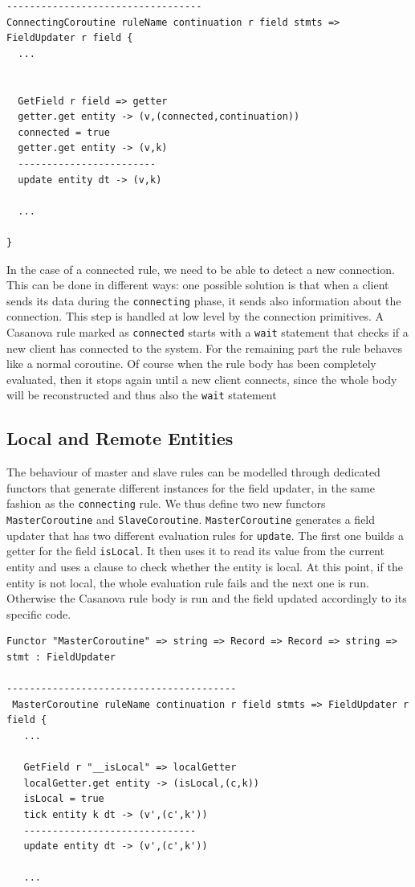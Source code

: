 \begin{lstlisting}
----------------------------------
ConnectingCoroutine ruleName continuation r field stmts => FieldUpdater r field {
  ...
  

  GetField r field => getter
  getter.get entity -> (v,(connected,continuation))
  connected = true
  getter.get entity -> (v,k)
  ------------------------
  update entity dt -> (v,k)
  
  ...

} 
\end{lstlisting}

\noindent
In the case of a connected rule, we need to be able to detect a new connection. This can be done in different ways: one possible solution is that when a client sends its data during the \texttt{connecting} phase, it sends also information about the connection. This step is handled at low level by the connection primitives. A Casanova rule marked as \texttt{connected} starts with a \texttt{wait} statement that checks if a new client has connected to the system. For the remaining part the rule behaves like a normal coroutine. Of course when the rule body has been completely evaluated, then it stops again until a new client connects, since the whole body will be reconstructed and thus also the \texttt{wait} statement

\subsection{Local and Remote Entities}
\label{subsec:ch_networking_local_and_remote}
The behaviour of master and slave rules can be modelled through dedicated functors that generate different instances for the field updater, in the same fashion as the \texttt{connecting} rule. We thus define two new functors \texttt{MasterCoroutine} and \texttt{SlaveCoroutine}. \texttt{MasterCoroutine} generates a field updater that has two different evaluation rules for \texttt{update}. The first one builds a getter for the field \texttt{\tu\tu isLocal}. It then uses it to read its value from the current entity and uses a clause to check whether the entity is local. At this point, if the entity is not local, the whole evaluation rule fails and the next one is run. Otherwise the Casanova rule body is run and the field updated accordingly to its specific code.

\begin{lstlisting}
Functor "MasterCoroutine" => string => Record => Record => string => stmt : FieldUpdater

----------------------------------------
 MasterCoroutine ruleName continuation r field stmts => FieldUpdater r field {
   ...
   
   GetField r "__isLocal" => localGetter
   localGetter.get entity -> (isLocal,(c,k))
   isLocal = true
   tick entity k dt -> (v',(c',k'))
   ------------------------------
   update entity dt -> (v',(c',k'))
   
   ...
\end{lstlisting}

